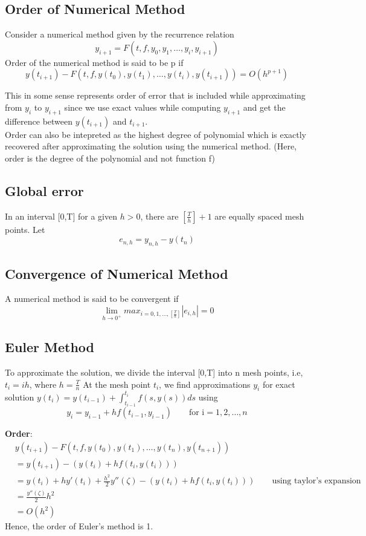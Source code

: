 \documentclass{article}
\begin{document}
	\subsection{Order of Numerical Method}
		Consider a numerical method given by the recurrence relation
		\[y_{i+1} = F(t,f, y_0, y_1,\hdots,y_i, y_{i+1})\]
		Order of the numerical method is said to be p if
		\[y(t_{i+1}) - F(t,f,y(t_0), y(t_1), \hdots, y(t_i),y(t_{i+1})) = O(h^{p+1})\] 

	This in some sense represents order of error that is included while approximating from $y_i$ to $y_{i+1}$ since we use exact values while computing $y_{i+1}$ and get the difference between $y(t_{i+1})$ and $t_{i+1}$. \\
	Order can also be intepreted as the highest degree of polynomial which is exactly recovered after approximating the solution using the numerical method. (Here, order is the degree of the polynomial and not function f)

	\subsection{Global error}
		In an interval [0,T] for a given $h>0$, there are $\left[\frac{T}{h} \right]+1$ are equally spaced mesh points. Let 
		\[e_{n,h} = y_{n,h} - y(t_n)\]

	\subsection{Convergence of Numerical Method}
		A numerical method is said to be convergent if 
		\[\lim_{h\rightarrow0^+} max_{i=0,1,\hdots,[\frac{T}{h}]} |e_{i,h}| = 0\]

	\subsection{Euler Method}
		To approximate the solution, we divide the interval [0,T] into n mesh points, i.e, $t_i = i h$, where $h= \frac{T}{n}$
		At the mesh point $t_i$, we find approximations $y_i$ for exact solution $y(t_i) = y(t_{i-1}) + \int_{t_{i-1}}^{t_{i}} f(s,y(s)) ds$ using
		\[y_i = y_{i-1} + h f(t_{i-1},y_{i-1}) \qquad \text{for i} = 1,2,\hdots,n \]

		\textbf{Order}:
		\begin{align*}
			&y(t_{i+1}) - F(t,f,y(t_0), y(t_1), \hdots, y(t_n),y(t_{n+1})) \\
			&= y(t_{i+1}) -( y(t_i) + h f(t_i, y(t_i)) )\\
			&= y(t_i) + h y'(t_i) + \frac{h^2}{2} y''(\zeta) - (y(t_i) + h f(t_i, y(t_i) )) \qquad \text{using taylor's expansion}\\
			&= \frac{y''(\zeta)}{2} h^2\\
			&= O(h^2)
		\end{align*}
		Hence, the order of Euler's method is 1.
\end{document}
